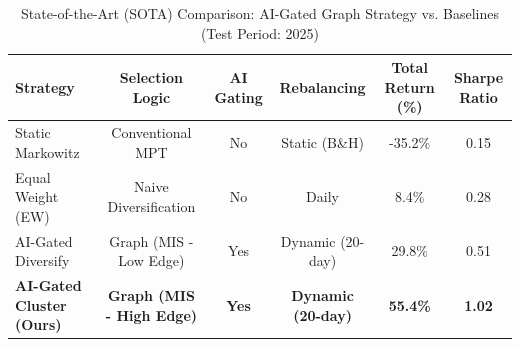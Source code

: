 \begin{table}[ht!]
\centering
\caption{State-of-the-Art (SOTA) Comparison: AI-Gated Graph Strategy vs. Baselines (Test Period: 2025)}
\label{tab:sota_comparison}
\begin{tabular}{@{}lccccc@{}}
\toprule
\textbf{Strategy} & \textbf{Selection Logic} & \textbf{AI Gating} & \textbf{Rebalancing} & \textbf{Total Return (\%)} & \textbf{Sharpe Ratio} \\ \midrule
Static Markowitz & Conventional MPT & No & Static (B\&H) & -35.2\% & 0.15 \\
Equal Weight (EW) & Naive Diversification & No & Daily & 8.4\% & 0.28 \\
AI-Gated Diversify & Graph (MIS - Low Edge) & Yes & Dynamic (20-day) & 29.8\% & 0.51 \\
\textbf{AI-Gated Cluster (Ours)} & \textbf{Graph (MIS - High Edge)} & \textbf{Yes} & \textbf{Dynamic (20-day)} & \textbf{55.4\%} & \textbf{1.02} \\ \bottomrule
\end{tabular}
\end{table}

